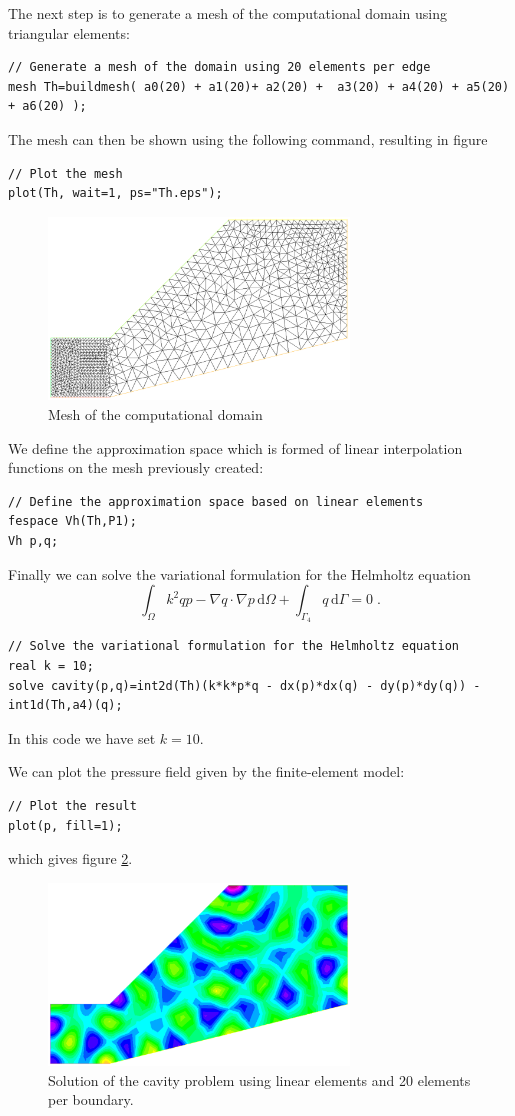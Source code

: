 \documentclass[english,3p]{elsarticle}
\newcommand{\dd}{\mathrm{d}}
\begin{document}
The next step is to generate a mesh of the computational domain using triangular elements:
\begin{lstlisting}
// Generate a mesh of the domain using 20 elements per edge
mesh Th=buildmesh( a0(20) + a1(20)+ a2(20) +  a3(20) + a4(20) + a5(20) + a6(20) );
\end{lstlisting}
The mesh can then be shown using the following command, resulting in figure
\begin{lstlisting}
// Plot the mesh
plot(Th, wait=1, ps="Th.eps");
\end{lstlisting}
\begin{figure}[ht]
\centering
\includegraphics[width=80mm]{mesh.eps}
\caption{Mesh of the computational domain}
\label{fig:mesh}
\end{figure}

We define the approximation space which is formed of linear interpolation functions on the mesh previously created:
\begin{lstlisting}
// Define the approximation space based on linear elements
fespace Vh(Th,P1);
Vh p,q;
\end{lstlisting}

Finally we can solve the variational formulation for the Helmholtz equation
$$
\int_\Omega k^2qp - \nabla q\cdot\nabla p\,\dd\Omega+
\int_{\Gamma_4} q\,\dd\Gamma
=0
\;.
$$
\begin{lstlisting}
// Solve the variational formulation for the Helmholtz equation
real k = 10;
solve cavity(p,q)=int2d(Th)(k*k*p*q - dx(p)*dx(q) - dy(p)*dy(q)) - int1d(Th,a4)(q);
\end{lstlisting}
In this code we have set $k=10$.

We can plot the pressure field given by the finite-element model:
\begin{lstlisting}
// Plot the result
plot(p, fill=1);
\end{lstlisting}
which gives figure \ref{fig:solution1}.
\begin{figure}[h]
\centering
\includegraphics[width=80mm]{solution_P1.eps}
\caption{Solution of the cavity problem using linear elements and 20 elements per boundary.}
\label{fig:solution1}
\end{figure}
\end{document}

